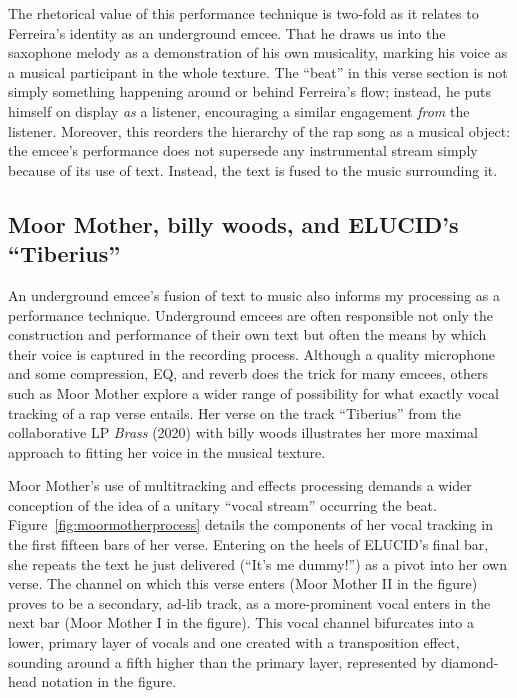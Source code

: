 The rhetorical value of this performance technique is two-fold as it relates to Ferreira's identity 
as an underground emcee. That he draws us into the saxophone melody as a demonstration of his own 
musicality, marking his voice as a musical participant in the whole texture. The ``beat'' in this 
verse section is not simply something happening around or behind Ferreira's flow; instead, he puts 
himself on display \emph{as} a listener, encouraging a similar engagement \emph{from} the listener.
Moreover, this reorders the hierarchy of the rap song as a musical object: the emcee's performance
does not supersede any instrumental stream simply because of its use of text. Instead, the text is
fused to the music surrounding it.

{}
\subsection*{\centering Moor Mother,  billy woods, and ELUCID's ``Tiberius''}

An underground emcee's fusion of text to music also informs my processing as a performance technique. 
Underground emcees are often responsible not only the construction and performance of their own text 
but often the means by which their voice is captured in the recording process. Although a quality 
microphone and some compression, EQ, and reverb does the trick for many emcees, others such as Moor 
Mother explore a wider range of possibility for what exactly vocal tracking of a rap verse entails.
Her verse on the track ``Tiberius'' from the collaborative LP \textit{Brass} (2020) with billy woods
illustrates her more maximal approach to fitting her voice in the musical texture.

Moor Mother's use of multitracking and effects processing demands a wider conception of the idea of a
unitary ``vocal stream'' occurring the beat. Figure~\ref{fig:moormotherprocess} details the components
of her vocal tracking in the first fifteen bars of her verse. Entering on the heels of ELUCID's final 
bar, she repeats the text he just delivered (``It's me dummy!'') as a pivot into her own verse. The 
channel on which this verse enters (Moor Mother II in the figure) proves to be a secondary, ad-lib 
track, as a more-prominent vocal  enters in the next bar (Moor Mother I in the figure). This vocal 
channel bifurcates into a lower, primary layer of vocals and one created with a transposition effect,
sounding around a fifth higher than the primary layer, represented by diamond-head notation in 
the figure.

